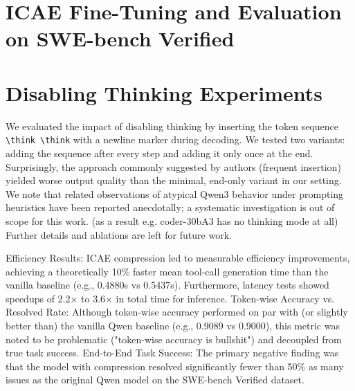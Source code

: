 \section{ICAE Fine-Tuning and Evaluation on SWE-bench Verified}

\section{Disabling Thinking Experiments}
\label{sec:disabling_thinking}

We evaluated the impact of disabling thinking by inserting the token sequence \texttt{\textbackslash think \textbackslash think} with a newline marker during decoding.
We tested two variants: adding the sequence after every step and adding it only once at the end.
Surprisingly, the approach commonly suggested by authors (frequent insertion) yielded worse output quality than the minimal, end-only variant in our setting.
We note that related observations of atypical Qwen3 behavior under prompting heuristics have been reported anecdotally; a systematic investigation is out of scope for this work. (as a result e.g. coder-30bA3 has no thinking mode at all)
Further details and ablations are left for future work.

Efficiency Results: ICAE \cite{ge_-context_2024} compression led to measurable efficiency improvements, achieving a theoretically 10\% faster mean tool-call generation time than the vanilla baseline (e.g., 0.4880s vs 0.5437s).
Furthermore, latency tests showed speedups of 2.2× to 3.6× in total time for inference.
Token-wise Accuracy vs. Resolved Rate: Although token-wise accuracy performed on par with (or slightly better than) the vanilla Qwen baseline (e.g., 0.9089 vs 0.9000), this metric was noted to be problematic ("token-wise accuracy is bullshit") and decoupled from true task success.
End-to-End Task Success: The primary negative finding was that the model with compression resolved significantly fewer than 50\% as many issues as the original Qwen model on the SWE-bench Verified dataset.

